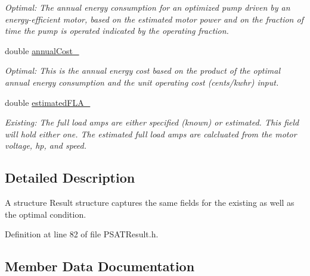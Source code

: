 \begin{DoxyCompactItemize}
\begin{DoxyCompactList}\small\item\em Optimal\+: The annual energy consumption for an optimized pump driven by an energy-\/efficient motor, based on the estimated motor power and on the fraction of time the pump is operated indicated by the operating fraction. \end{DoxyCompactList}\item 
double \hyperlink{struct_p_s_a_t_result_1_1result___abccf2d1c8dabf109df4c3c369cb24365}{annual\+Cost\+\_\+}
\begin{DoxyCompactList}\small\item\em Optimal\+: This is the annual energy cost based on the product of the optimal annual energy consumption and the unit operating cost (cents/kwhr) input. \end{DoxyCompactList}\item 
\mbox{\label{struct_p_s_a_t_result_1_1result___a35d120feb27c2ee3f0dd3f995b4d7840}} 
double \hyperlink{struct_p_s_a_t_result_1_1result___a35d120feb27c2ee3f0dd3f995b4d7840}{estimated\+F\+L\+A\+\_\+}
\begin{DoxyCompactList}\small\item\em Existing\+: The full load amps are either specified (known) or estimated. This field will hold either one. The estimated full load amps are calcluated from the motor voltage, hp, and speed. \end{DoxyCompactList}\end{DoxyCompactItemize}


\subsection{Detailed Description}
A structure Result structure captures the same fields for the existing as well as the optimal condition. 

Definition at line 82 of file P\+S\+A\+T\+Result.\+h.



\subsection{Member Data Documentation}
\mbox{\label{struct_p_s_a_t_result_1_1result___abccf2d1c8dabf109df4c3c369cb24365}} 
